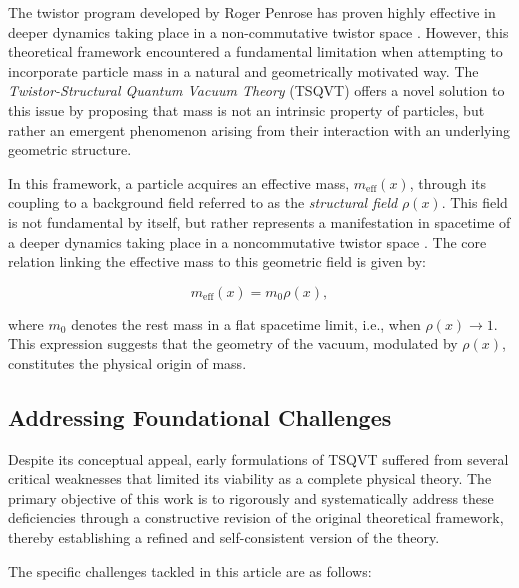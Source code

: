 \documentclass[a4paper]{article}
\begin{document}
The twistor program developed by Roger Penrose has proven highly effective in deeper dynamics taking place in a non-commutative twistor space \cite{Penrose1967}. However, this theoretical framework encountered a fundamental limitation when attempting to incorporate particle mass in a natural and geometrically motivated way. The \textit{Twistor-Structural Quantum Vacuum Theory} (TSQVT) \cite{Makraini2025} offers a novel solution to this issue by proposing that mass is not an intrinsic property of particles, but rather an emergent phenomenon arising from their interaction with an underlying geometric structure.

In this framework, a particle acquires an effective mass, \( m_{\text{eff}}(x) \), through its coupling to a background field referred to as the \textit{structural field} \( \rho(x) \). This field is not fundamental by itself, but rather represents a manifestation in spacetime of a deeper dynamics taking place in a noncommutative twistor space \cite{Connes1994}. The core relation linking the effective mass to this geometric field is given by:

\begin{equation}
	m_{\text{eff}}(x) = m_0 \rho(x),
\end{equation}

where \( m_0 \) denotes the rest mass in a flat spacetime limit, i.e., when \( \rho(x) \to 1 \). This expression suggests that the geometry of the vacuum, modulated by \( \rho(x) \), constitutes the physical origin of mass.

\subsection{Addressing Foundational Challenges}

Despite its conceptual appeal, early formulations of TSQVT suffered from several critical weaknesses that limited its viability as a complete physical theory. The primary objective of this work is to rigorously and systematically address these deficiencies through a constructive revision of the original theoretical framework, thereby establishing a refined and self-consistent version of the theory.

The specific challenges tackled in this article are as follows:
\end{document}
